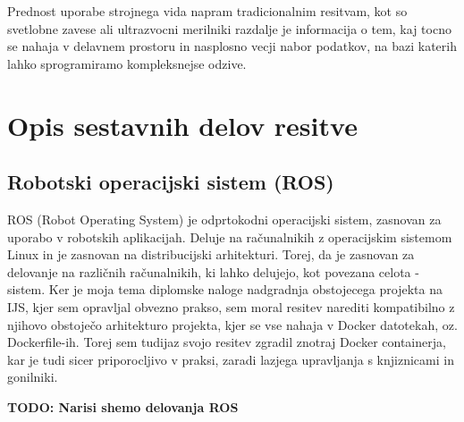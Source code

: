 \documentclass[a4paper,twoside,openright,12pt,slovene]{book}
\begin{document}
Prednost uporabe strojnega vida napram tradicionalnim resitvam, kot so svetlobne zavese ali ultrazvocni merilniki razdalje je informacija o tem, kaj tocno se nahaja v delavnem prostoru in nasplosno vecji nabor podatkov, na bazi katerih lahko sprogramiramo kompleksnejse odzive.

\chapter{Opis sestavnih delov resitve} \label{opis_komponent}
\section{Robotski operacijski sistem (ROS)} \label{ROS}
ROS (Robot Operating System) je odprtokodni operacijski sistem, zasnovan za uporabo v robotskih aplikacijah. Deluje na računalnikih z operacijskim sistemom Linux in je zasnovan na distribucijski arhitekturi. Torej, da je zasnovan za delovanje na različnih računalnikih, ki lahko delujejo, kot povezana celota - sistem. Ker je moja tema diplomske naloge nadgradnja obstojecega projekta na IJS, kjer sem opravljal obvezno prakso, sem moral resitev narediti kompatibilno z njihovo obstoječo arhitekturo projekta, kjer se vse nahaja v Docker datotekah, oz. Dockerfile-ih. Torej sem tudijaz svojo resitev zgradil znotraj Docker containerja, kar je tudi sicer priporocljivo v praksi, zaradi lazjega upravljanja s knjiznicami in gonilniki. 

\textbf{TODO: Narisi shemo delovanja ROS}
\end{document}
